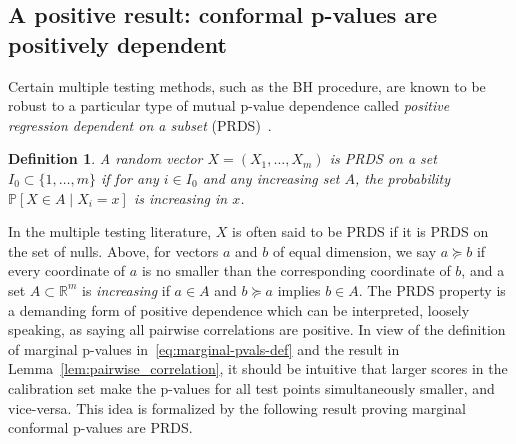\documentclass[11pt]{article}
\newtheorem{cor}{Corollary}
\newtheorem{defn}{Definition}
\def\marg{\textnormal{(marg)}}
\renewcommand{\P}{\mathbb{P}}
\begin{document}

\subsection{A positive result: conformal p-values are positively dependent} \label{sec:positive-fdr}

Certain multiple testing methods, such as the BH procedure, are known to be robust to a particular type of mutual p-value dependence called \emph{positive regression dependent on a subset} (PRDS)~\cite{benjamini2001control}. 
\begin{defn} \label{def:PRDS}
A random vector $X = (X_1,\dots,X_m)$ is PRDS on a set $I_0\subset \{1, \ldots, m\}$ if for any $i \in I_0$ and any increasing set $A$, the probability $\P[X \in A \mid X_i = x]$ is increasing in $x$. 
\end{defn}
In the multiple testing literature, $X$ is often said to be PRDS if it is PRDS on the set of nulls. Above, for vectors $a$ and $b$ of equal dimension, we say $a \succeq b$ if every coordinate of $a$ is no smaller than the corresponding coordinate of $b$, and a set $A \subset \mathbb{R}^m$ is \emph{increasing} if $a \in A$ and $b \succeq a$ implies $b \in A$.
The PRDS property is a demanding form of positive dependence which can be interpreted, loosely speaking, as saying all pairwise correlations are positive. 
In view of the definition of marginal p-values in~\eqref{eq:marginal-pvals-def} and the result in Lemma~\ref{lem:pairwise_correlation}, it should be intuitive that larger scores in the calibration set make the p-values for all test points simultaneously smaller, and vice-versa. This idea is formalized by the following result proving marginal conformal p-values are PRDS.
\end{document}
